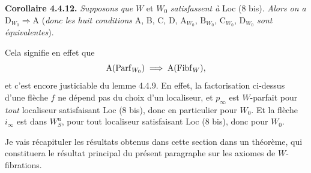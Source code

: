 \textbf{Corollaire 4.4.12.} \textit{Supposons que} $W$ et $W_0$ \textit{satisfassent à} Loc (8 bis). \textit{Alors on a} $\mathrm{D}_{W_0} \Longrightarrow \mathrm{A}$ (\textit{donc les huit conditions} A, B, C, D, $\mathrm{A}_{W_0}$, $\mathrm{B}_{W_0}$, $\mathrm{C}_{W_0}$, $\mathrm{D}_{W_0}$ \textit{sont équivalentes}).

Cela signifie en effet que
\[
\mathrm{A}(\mathrm{Parf}_{W_0}) \;\Longrightarrow\; \mathrm{A}(\mathrm{Fibf}_W),
\]
et c'est encore justiciable du lemme 4.4.9. En effet, la factorisation ci-dessus d'une flèche $f$ ne dépend pas du choix d'un localiseur, et $p_\infty$ est $W$-parfait pour \textit{tout} localiseur satisfaisant Loc (8 bis), donc en particulier pour $W_0$. Et la flèche $i_\infty$ est dans $W^{\mathrm{u}}_S$, pour tout localiseur satisfaisant Loc (8 bis), donc pour $W_0$.

Je vais récapituler les résultats obtenus dans cette section dans un théorème, qui constituera le résultat principal du présent paragraphe sur les axiomes de $W$-fibrations.

